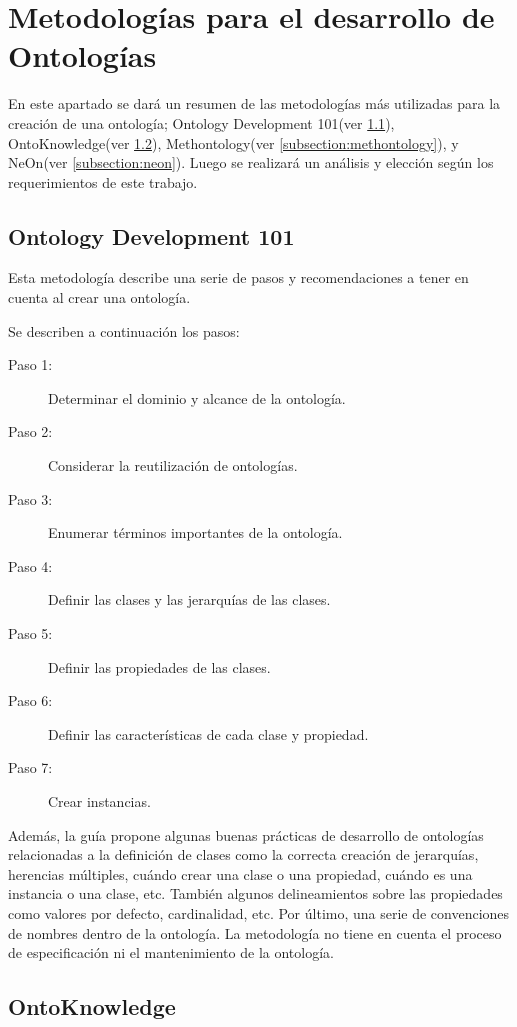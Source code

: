 \section{Metodologías para el desarrollo de Ontologías}

En este apartado se dará un resumen de las metodologías más utilizadas para la creación de una ontología; Ontology Development 101(ver \ref{subsection:101}), OntoKnowledge(ver \ref{subsection:ontoknowledge}), Methontology(ver \ref{subsection:methontology}), y NeOn(ver \ref{subsection:neon}). Luego se realizará un análisis y elección según los requerimientos de este trabajo.

\subsection{Ontology Development 101}
\label{subsection:101}

Esta metodología describe una serie de pasos y recomendaciones a tener en cuenta al crear una ontología\cite{noy2001ontology}. 

Se describen a continuación los pasos:
\begin{description}
\item[Paso 1:] Determinar el dominio y alcance de la ontología.
\item[Paso 2:] Considerar la reutilización de ontologías.
\item[Paso 3:] Enumerar términos importantes de la ontología.
\item[Paso 4:] Definir las clases y las jerarquías de las clases.
\item[Paso 5:] Definir las propiedades de las clases.
\item[Paso 6:] Definir las características de cada clase y propiedad.
\item[Paso 7:] Crear instancias.
\end{description}

Además, la guía propone algunas buenas prácticas de desarrollo de ontologías relacionadas a la definición de clases como la correcta creación de jerarquías, herencias múltiples,  cuándo crear una clase o una propiedad, cuándo es una instancia o una clase, etc. También algunos delineamientos sobre las propiedades como valores por defecto, cardinalidad, etc. Por último, una serie de convenciones de nombres dentro de la ontología. La metodología no tiene en cuenta el proceso de especificación ni el mantenimiento de la ontología.

\subsection{OntoKnowledge} 
\label{subsection:ontoknowledge}

